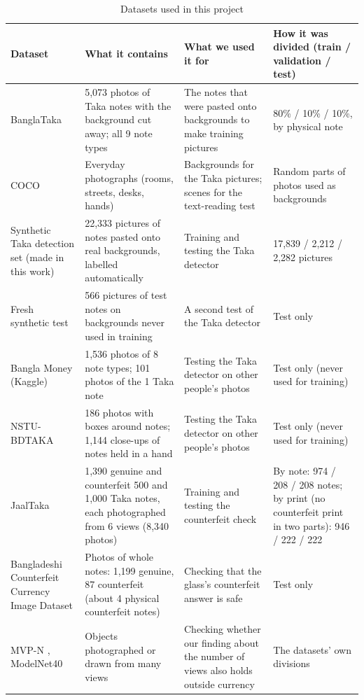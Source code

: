 \begin{table}[!htbp]
\centering
\caption{Datasets used in this project}
\label{tab:datasets}
\small
\begin{tabular}{|L{3.0cm}|L{3.9cm}|L{3.1cm}|L{3.9cm}|}
\hline
\textbf{Dataset} & \textbf{What it contains} & \textbf{What we used it for} & \textbf{How it was divided (train / validation / test)} \\ \hline
BanglaTaka \cite{banglataka} & 5,073 photos of Taka notes with the background cut away; all 9 note types & The notes that were pasted onto backgrounds to make training pictures & 80\% / 10\% / 10\%, by physical note \\ \hline
COCO \cite{coco} & Everyday photographs (rooms, streets, desks, hands) & Backgrounds for the Taka pictures; scenes for the text-reading test & Random parts of photos used as backgrounds \\ \hline
Synthetic Taka detection set (made in this work) & 22,333 pictures of notes pasted onto real backgrounds, labelled automatically & Training and testing the Taka detector & 17,839 / 2,212 / 2,282 pictures \\ \hline
Fresh synthetic test & 566 pictures of test notes on backgrounds never used in training & A second test of the Taka detector & Test only \\ \hline
Bangla Money (Kaggle) & 1,536 photos of 8 note types; 101 photos of the 1 Taka note & Testing the Taka detector on other people's photos & Test only (never used for training) \\ \hline
NSTU-BDTAKA \cite{nstubdtaka2024} & 186 photos with boxes around notes; 1,144 close-ups of notes held in a hand & Testing the Taka detector on other people's photos & Test only (never used for training) \\ \hline
JaalTaka \cite{jaaltaka} & 1,390 genuine and counterfeit 500 and 1,000 Taka notes, each photographed from 6 views (8,340 photos) & Training and testing the counterfeit check & By note: 974 / 208 / 208 notes; by print (no counterfeit print in two parts): 946 / 222 / 222 \\ \hline
Bangladeshi Counterfeit Currency Image Dataset & Photos of whole notes: 1,199 genuine, 87 counterfeit (about 4 physical counterfeit notes) & Checking that the glass's counterfeit answer is safe & Test only \\ \hline
MVP-N \cite{mvpn}, ModelNet40 \cite{modelnet} & Objects photographed or drawn from many views & Checking whether our finding about the number of views also holds outside currency & The datasets' own divisions \\ \hline

\end{tabular}
\end{table}

